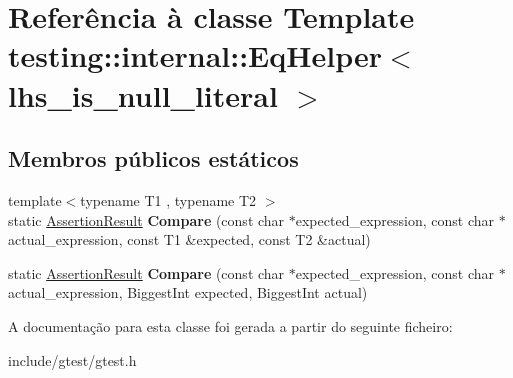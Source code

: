 \hypertarget{classtesting_1_1internal_1_1EqHelper}{\section{Referência à classe Template testing\-:\-:internal\-:\-:Eq\-Helper$<$ lhs\-\_\-is\-\_\-null\-\_\-literal $>$}
\label{classtesting_1_1internal_1_1EqHelper}
}
\subsection*{Membros públicos estáticos}
\begin{DoxyCompactItemize}
\item 
\hypertarget{classtesting_1_1internal_1_1EqHelper_ac2977ed90cd3c88607f804e43b86b92c}{{\footnotesize template$<$typename T1 , typename T2 $>$ }\\static \hyperlink{classtesting_1_1AssertionResult}{Assertion\-Result} {\bfseries Compare} (const char $\ast$expected\-\_\-expression, const char $\ast$actual\-\_\-expression, const T1 \&expected, const T2 \&actual)}\label{classtesting_1_1internal_1_1EqHelper_ac2977ed90cd3c88607f804e43b86b92c}

\item 
\hypertarget{classtesting_1_1internal_1_1EqHelper_a3de996954b41d484c065ed824fe7eac9}{static \hyperlink{classtesting_1_1AssertionResult}{Assertion\-Result} {\bfseries Compare} (const char $\ast$expected\-\_\-expression, const char $\ast$actual\-\_\-expression, Biggest\-Int expected, Biggest\-Int actual)}\label{classtesting_1_1internal_1_1EqHelper_a3de996954b41d484c065ed824fe7eac9}

\end{DoxyCompactItemize}


A documentação para esta classe foi gerada a partir do seguinte ficheiro\-:\begin{DoxyCompactItemize}
\item 
include/gtest/gtest.\-h\end{DoxyCompactItemize}

